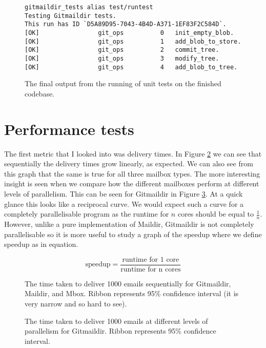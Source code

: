\begin{figure}[h]
\centering
\begin{Verbatim}
gitmaildir_tests alias test/runtest
Testing Gitmaildir tests.
This run has ID `D5A89D95-7043-4B4D-A371-1EF83F2C584D`.
[OK]                git_ops          0   init_empty_blob.
[OK]                git_ops          1   add_blob_to_store.
[OK]                git_ops          2   commit_tree.
[OK]                git_ops          3   modify_tree.
[OK]                git_ops          4   add_blob_to_tree.
\end{Verbatim}
\caption{The final output from the running of unit tests on the finished codebase.}
\label{fig:unittests}
\end{figure}

\section{Performance tests}

The first metric that I looked into was delivery times. In Figure \ref{fig:tds_combined} we can see that sequentially the delivery times grow linearly, as expected. We can also see from this graph that the same is true for all three mailbox types. The more interesting insight is seen when we compare how the different mailboxes perform at different levels of parallelism. This can be seen for Gitmaildir in Figure \ref{fig:tdpp}. At a quick glance this looks like a reciprocal curve. We would expect such a curve for a completely parallelisable program as the runtime for $n$ cores should be equal to $\frac{1}{n}$. However, unlike a pure implementation of Maildir, Gitmaildir is not completely parallelisable so it is more useful to study a graph of the speedup where we define speedup as in equation.

\begin{equation} \label{eq:speedup}
\textrm{speedup} = \frac{\textrm{runtime for 1 core}}{\textrm{runtime for n cores}}
\end{equation}

\begin{figure}[h]
    \centering
    
    \caption{The time taken to deliver 1000 emails sequentially for Gitmaildir, Maildir, and Mbox. Ribbon represents 95\% confidence interval (it is very narrow and so hard to see).}
    \label{fig:tds_combined}
\end{figure}


\begin{figure}[h]
    \centering
    
    \caption{The time taken to deliver 1000 emails at different levels of parallelism for Gitmaildir. Ribbon represents 95\% confidence interval.}
    \label{fig:tdpp}
\end{figure}

